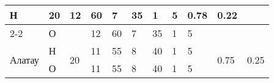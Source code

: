 \begin{table}[H]
\begin{tabular}{|ll|l|llllll|ll|}
    Н &
    \multirow{2}{*}{20} &
    \multicolumn{1}{l|}{12} &
    \multicolumn{1}{l|}{60} &
    \multicolumn{1}{l|}{7} &
    \multicolumn{1}{l|}{35} &
    \multicolumn{1}{l|}{1} &
    5 &
    \multicolumn{1}{l|}{\multirow{2}{*}{0.78}} &
    \multirow{2}{*}{0.22} \\ \cline{2-2} \cline{4-9}
  \multicolumn{1}{|l|}{} &
    О &
     &
    \multicolumn{1}{l|}{12} &
    \multicolumn{1}{l|}{60} &
    \multicolumn{1}{l|}{7} &
    \multicolumn{1}{l|}{35} &
    \multicolumn{1}{l|}{1} &
    5 &
    \multicolumn{1}{l|}{} &
     \\ \hline
  \multicolumn{1}{|l|}{\multirow{2}{*}{Алатау}} &
    Н &
    \multirow{2}{*}{20} &
    \multicolumn{1}{l|}{11} &
    \multicolumn{1}{l|}{55} &
    \multicolumn{1}{l|}{8} &
    \multicolumn{1}{l|}{40} &
    \multicolumn{1}{l|}{1} &
    5 &
    \multicolumn{1}{l|}{\multirow{2}{*}{0.75}} &
    \multirow{2}{*}{0.25} \\ \cline{2-2} \cline{4-9}
  \multicolumn{1}{|l|}{} &
    О &
     &
    \multicolumn{1}{l|}{11} &
    \multicolumn{1}{l|}{55} &
    \multicolumn{1}{l|}{8} &
    \multicolumn{1}{l|}{40} &
    \multicolumn{1}{l|}{1} &
    5 &
    \multicolumn{1}{l|}{} &
     \\ \hline
  \end{tabular}%
\end{table}



